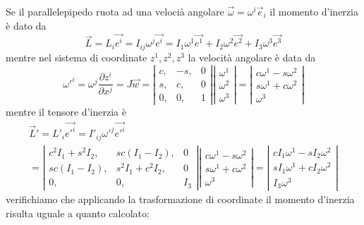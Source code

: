 \documentclass[a4paper,11pt]{article}
\begin{document}
Se il parallelepipedo ruota ad una velocià angolare $ \vec \omega = \omega^i \vec e_i$ il momento d'inerzia è dato da
\[
	\vec L = L_i \vec {e^i} = I_{ij} \omega^j \vec {e^i} = I_1 \omega^1 \vec {e^1} +  I_2 \omega^2 \vec {e^2} + I_3 \omega^3 \vec {e^3}
\]
mentre nel sistema di coordinate $ z^1,  z^2, z^3 $
la velocità angolare è data da
\[
	{\omega'}^i = \omega^j \frac{\partial z^i}{\partial x^j} = J \vec w = 
	\left|
\begin{array}{lll}
	c, & -s, & 0
\\
	s, & c, & 0
\\
	0, & 0, & 1	
\end{array}
	\right|
	\left|
\begin{array}{l}
	\omega^1
\\
	\omega^2
\\
	\omega^3
\end{array}
	\right|
=
	\left|
\begin{array}{l}
	c \omega^1 - s \omega^2
\\
	s \omega^1 + c \omega^2
\\
	\omega^3
\end{array}
	\right|
\]
mentre il tensore d'inerzia è
\begin{eqnarray*}
	\vec L' = L'_i \vec {e'^i} = I'_{ij} {\omega'}^j \vec {e'^i}
\\
	= 
	\left|
\begin{array}{lll}
	c^2 I_1 + s^2 I_2, & sc (I_1 - I_2), & 0
\\
	sc (I_1 - I_2), &s^2 I_1 + c^2 I_2 , & 0
\\
	0, & 0, & I_3
\end{array}
	\right|
	\left|
\begin{array}{l}
	c \omega^1 - s \omega^2
\\
	s \omega^1 + c \omega^2
\\
	\omega^3
\end{array}
	\right|
= 
	\left|
\begin{array}{l}
	c I_1 \omega^1 - s I_2 \omega^2
\\
	s I_1 \omega^1 + c I_2 \omega^2
\\
	I_3 \omega^3
\end{array}
	\right|
\end{eqnarray*}
verifichiamo che applicando la trasformazione di coordinate il momento d'inerzia risulta uguale a quanto calcolato:
\end{document}
